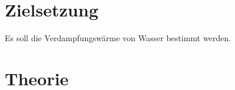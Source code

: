 \section{Zielsetzung}
\label{sec:Zielsetzung}
Es soll die Verdampfungswärme von Wasser bestimmt werden.

\section{Theorie}
\label{sec:Theorie}


\cite{sample}
